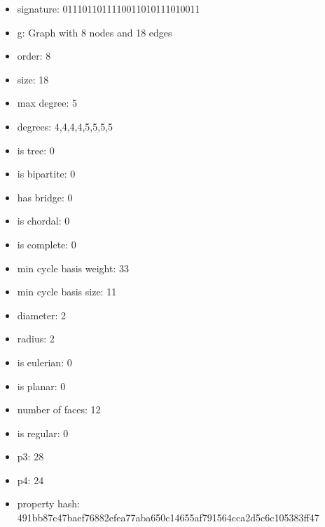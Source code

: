 \begin{itemize}
\item signature: 0111011011110011010111010011
\item g: Graph with 8 nodes and 18 edges
\item order: 8
\item size: 18
\item max degree: 5
\item degrees: 4,4,4,4,5,5,5,5
\item is tree: 0
\item is bipartite: 0
\item has bridge: 0
\item is chordal: 0
\item is complete: 0
\item min cycle basis weight: 33
\item min cycle basis size: 11
\item diameter: 2
\item radius: 2
\item is eulerian: 0
\item is planar: 0
\item number of faces: 12
\item is regular: 0
\item p3: 28
\item p4: 24
\item property hash: 491bb87c47baef76882efea77aba650c14655af791564cca2d5c6c105383ff47
\end{itemize}
\newpage
